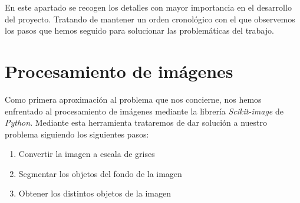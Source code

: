 
En este apartado se recogen los detalles con mayor importancia en el desarrollo del proyecto. Tratando de mantener un orden cronológico con el que observemos los pasos que hemos seguido para solucionar las problemáticas del trabajo.

\begin{comment}
Este apartado pretende recoger los aspectos más interesantes del desarrollo del proyecto, comentados por los autores del mismo.
Debe incluir desde la exposición del ciclo de vida utilizado, hasta los detalles de mayor relevancia de las fases de análisis, diseño e implementación.
Se busca que no sea una mera operación de copiar y pegar diagramas y extractos del código fuente, sino que realmente se justifiquen los caminos de solución que se han tomado, especialmente aquellos que no sean triviales.
Puede ser el lugar más adecuado para documentar los aspectos más interesantes del diseño y de la implementación, con un mayor hincapié en aspectos tales como el tipo de arquitectura elegido, los índices de las tablas de la base de datos, normalización y desnormalización, distribución en ficheros3, reglas de negocio dentro de las bases de datos (EDVHV GH GDWRV DFWLYDV), aspectos de desarrollo relacionados con el WWW...
Este apartado, debe convertirse en el resumen de la experiencia práctica del proyecto, y por sí mismo justifica que la memoria se convierta en un documento útil, fuente de referencia para los autores, los tutores y futuros alumnos.
\end{comment}

\section{Procesamiento de imágenes}

Como primera aproximación al problema que nos concierne, nos hemos enfrentado al procesamiento de imágenes mediante la librería \textit{Scikit-image} de \textit{Python}. Mediante esta herramienta trataremos de dar solución a nuestro problema siguiendo los siguientes pasos:

\begin{enumerate}[1.]
  \item Convertir la imagen a escala de grises
  \item Segmentar los objetos del fondo de la imagen
  \item Obtener los distintos objetos de la imagen
\end{enumerate}

